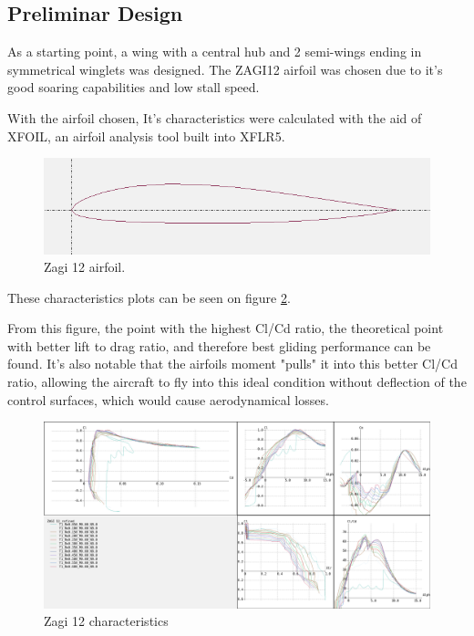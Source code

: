 \subsection{Preliminar Design}

As a starting point, a wing with a central hub and 2 semi-wings ending in symmetrical winglets was designed. The ZAGI12 airfoil was chosen due to it's good soaring capabilities and low stall speed.

With the airfoil chosen, It's characteristics were calculated with the aid of XFOIL, an airfoil analysis tool built into XFLR5.

\begin{figure}[h]
\centering
  \includegraphics[width=\linewidth]{figs/zagi12.png}
  \caption{Zagi 12 airfoil.}
  \label{fig:zagi12}
\end{figure}


These characteristics plots can be seen on figure \ref{fig:zagi12polares}.
%

From this figure, the point with the highest Cl/Cd ratio, the theoretical point with better lift to drag ratio, and therefore best gliding performance can be found. It's also notable that the airfoils moment "pulls" it into this better Cl/Cd ratio, allowing the aircraft to fly into this ideal condition without deflection of the control surfaces, which would cause aerodynamical losses.


\begin{figure}
\centering
  \includegraphics[width=\linewidth]{figs/polares.png}
  \caption{Zagi 12 characteristics}
  \label{fig:zagi12polares}
\end{figure}

